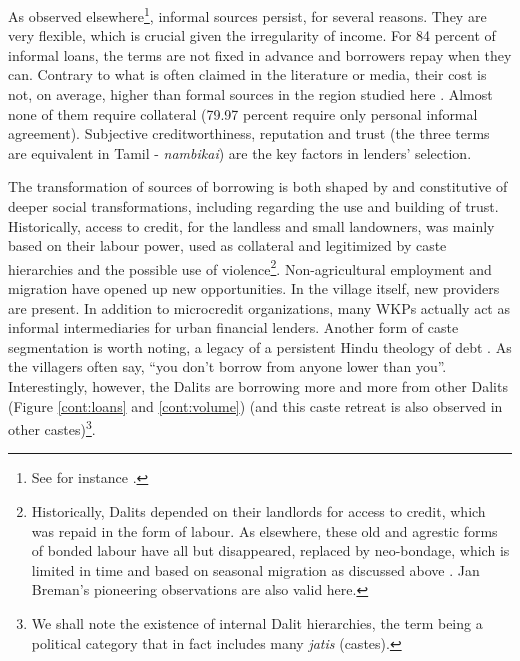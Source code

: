 \documentclass[a4paper, 11pt, onecolumn]{article}
\begin{document}
As observed elsewhere\footnote{See for instance \cite{Morvant2013, Collins2009, Shipton2007, James2015, Saiag2020, Guerin2013}.}, informal sources persist, for several reasons. 
They are very flexible, which is crucial given the irregularity of income. 
For 84 percent of informal loans, the terms are not fixed in advance and borrowers repay when they can. Contrary to what is often claimed in the literature or media, their cost is not, on average, higher than formal sources in the region studied here \citep{Reboul2019}. 
Almost none of them require collateral (79.97 percent require only personal informal agreement). 
Subjective creditworthiness, reputation and trust (the three terms are equivalent in Tamil - \textit{nambikai}) are the key factors in lenders' selection. 

The transformation of sources of borrowing is both shaped by and constitutive of deeper social transformations, including regarding the use and building of trust.
Historically, access to credit, for the landless and small landowners, was mainly based on their labour power, used as collateral and legitimized by caste hierarchies and the possible use of violence\footnote{Historically, Dalits depended on their landlords for access to credit, which was repaid in the form of labour. As elsewhere, these old and agrestic forms of bonded labour have all but disappeared, replaced by neo-bondage, which is limited in time and based on seasonal migration as discussed above \citep{Breman1974}. Jan Breman's pioneering observations are also valid here.}. 
Non-agricultural employment and migration have opened up new opportunities. 
In the village itself, new providers are present. 
In addition to microcredit organizations, many WKPs actually act as informal intermediaries for urban financial lenders. 
Another form of caste segmentation is worth noting, a legacy of a persistent Hindu theology of debt \citep{Kane2012}. 
As the villagers often say, ``you don't borrow from anyone lower than you''. 
Interestingly, however, the Dalits are borrowing more and more from other Dalits (Figure \ref{cont:loans} and \ref{cont:volume}) (and this caste retreat is also observed in other castes)\footnote{We shall note the existence of internal Dalit hierarchies, the term being a political category that in fact includes many \textit{jatis} (castes).}.  
\end{document}
